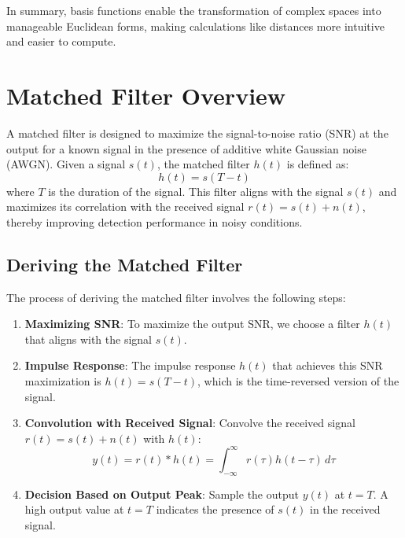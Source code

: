 \documentclass[10pt]{article}
\begin{document}
In summary, basis functions enable the transformation of complex spaces into manageable Euclidean forms, making calculations like distances more intuitive and easier to compute.


\section{Matched Filter Overview}
A matched filter is designed to maximize the signal-to-noise ratio (SNR) at the output for a known signal in the presence of additive white Gaussian noise (AWGN). Given a signal \( s(t) \), the matched filter \( h(t) \) is defined as:
\[
h(t) = s(T - t)
\]
where \( T \) is the duration of the signal. This filter aligns with the signal \( s(t) \) and maximizes its correlation with the received signal \( r(t) = s(t) + n(t) \), thereby improving detection performance in noisy conditions.

\subsection{Deriving the Matched Filter}
The process of deriving the matched filter involves the following steps:
\begin{enumerate}
    \item \textbf{Maximizing SNR}: To maximize the output SNR, we choose a filter \( h(t) \) that aligns with the signal \( s(t) \).
    \item \textbf{Impulse Response}: The impulse response \( h(t) \) that achieves this SNR maximization is \( h(t) = s(T - t) \), which is the time-reversed version of the signal.
    \item \textbf{Convolution with Received Signal}: Convolve the received signal \( r(t) = s(t) + n(t) \) with \( h(t) \):
    \[
    y(t) = r(t) * h(t) = \int_{-\infty}^{\infty} r(\tau) h(t - \tau) \, d\tau
    \]
    \item \textbf{Decision Based on Output Peak}: Sample the output \( y(t) \) at \( t = T \). A high output value at \( t = T \) indicates the presence of \( s(t) \) in the received signal.
\end{enumerate}
\end{document}
